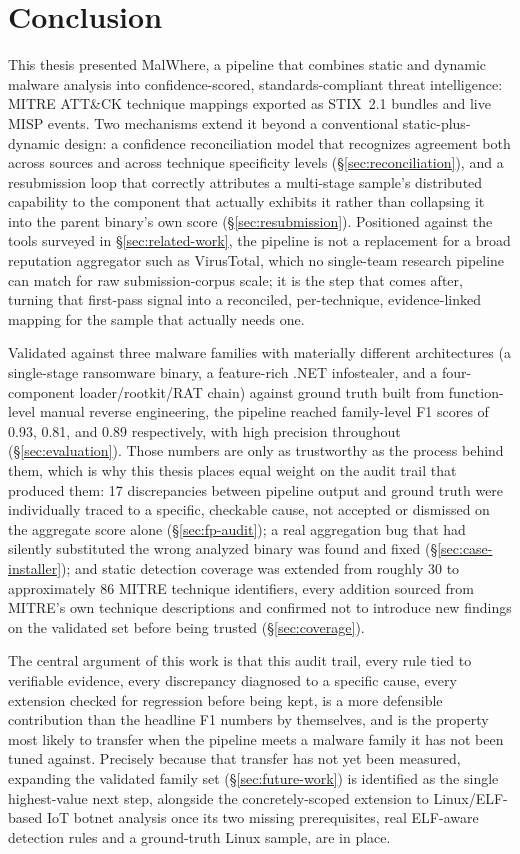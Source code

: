 \section{Conclusion}
\label{sec:conclusion}

This thesis presented MalWhere, a pipeline that combines static and
dynamic malware analysis into confidence-scored, standards-compliant
threat intelligence: MITRE ATT\&CK technique mappings exported as
STIX~2.1 bundles and live MISP events. Two mechanisms extend it beyond
a conventional static-plus-dynamic design: a confidence reconciliation
model that recognizes agreement both across sources and across
technique specificity levels (\S\ref{sec:reconciliation}), and a
resubmission loop that correctly attributes a multi-stage sample's
distributed capability to the component that actually exhibits it
rather than collapsing it into the parent binary's own score
(\S\ref{sec:resubmission}). Positioned against the tools surveyed in
\S\ref{sec:related-work}, the pipeline is not a replacement for a
broad reputation aggregator such as VirusTotal, which no single-team
research pipeline can match for raw submission-corpus scale; it is the
step that comes after, turning that first-pass signal into a
reconciled, per-technique, evidence-linked mapping for the sample that
actually needs one.

Validated against three malware families with materially different
architectures (a single-stage ransomware binary, a feature-rich .NET
infostealer, and a four-component loader/rootkit/RAT chain) against
ground truth built from function-level manual reverse engineering, the
pipeline reached family-level F1 scores of 0.93, 0.81, and 0.89
respectively, with high precision throughout
(\S\ref{sec:evaluation}). Those numbers are only as trustworthy as the
process behind them, which is why this thesis places equal weight on
the audit trail that produced them: 17 discrepancies between pipeline
output and ground truth were individually traced to a specific,
checkable cause, not accepted or dismissed on the aggregate score
alone (\S\ref{sec:fp-audit}); a real aggregation bug that had silently
substituted the wrong analyzed binary was found and fixed
(\S\ref{sec:case-installer}); and static detection coverage was
extended from roughly 30 to approximately 86 MITRE technique
identifiers, every addition sourced from MITRE's own technique
descriptions and confirmed not to introduce new findings on the
validated set before being trusted (\S\ref{sec:coverage}).

The central argument of this work is that this audit trail, every rule
tied to verifiable evidence, every discrepancy diagnosed to a specific
cause, every extension checked for regression before being kept, is a
more defensible contribution than the headline F1 numbers by
themselves, and is the property most likely to transfer when the
pipeline meets a malware family it has not been tuned against.
Precisely because that transfer has not yet been measured, expanding
the validated family set (\S\ref{sec:future-work}) is identified as
the single highest-value next step, alongside the concretely-scoped
extension to Linux/ELF-based IoT botnet analysis once its two missing
prerequisites, real ELF-aware detection rules and a ground-truth Linux
sample, are in place.
